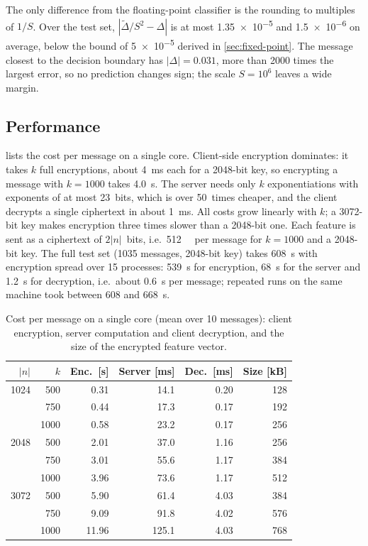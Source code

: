 The only difference from the floating-point classifier is the rounding to multiples of $1/S$.
Over the test set, $|\tilde{\Delta}/S^2 - \Delta|$ is at most \num{1.35e-5} and \num{1.5e-6} on average, below the bound of \num{5e-5} derived in \cref{sec:fixed-point}.
The message closest to the decision boundary has $|\Delta| = 0.031$, more than \num{2000} times the largest error, so no prediction changes sign; the scale $S = 10^6$ leaves a wide margin.

\subsection{Performance}

 lists the cost per message on a single core.
Client-side encryption dominates: it takes $k$ full encryptions, about \SI{4}{\milli\second} each for a \num{2048}-bit key, so encrypting a message with $k = 1000$ takes \SI{4.0}{\second}.
The server needs only $k$ exponentiations with exponents of at most 23~bits, which is over 50~times cheaper, and the client decrypts a single ciphertext in about \SI{1}{\milli\second}.
All costs grow linearly with $k$; a \num{3072}-bit key makes encryption three times slower than a \num{2048}-bit one.
Each feature is sent as a ciphertext of $2|n|$~bits, i.e.\ \SI{512}{\kilo\byte} per message for $k = 1000$ and a \num{2048}-bit key.
The full test set (\num{1035} messages, \num{2048}-bit key) takes \SI{608}{\second} with encryption spread over 15 processes: \SI{539}{\second} for encryption, \SI{68}{\second} for the server and \SI{1.2}{\second} for decryption, i.e.\ about \SI{0.6}{\second} per message; repeated runs on the same machine took between \num{608} and \SI{668}{\second}.

\begin{table}[htbp]
  \centering
  \caption{Cost per message on a single core (mean over 10 messages): client encryption, server computation and client decryption, and the size of the encrypted feature vector.}
  \label{tab:cost}
  \begin{tabular}{@{}rrrrrr@{}}
    \toprule
    $|n|$ & $k$ & Enc.\ [s] & Server [ms] & Dec.\ [ms] & Size [kB] \\
    \midrule
    1024 & 500  & 0.31  & 14.1  & 0.20 & 128 \\
         & 750  & 0.44  & 17.3  & 0.17 & 192 \\
         & 1000 & 0.58  & 23.2  & 0.17 & 256 \\
    \midrule
    2048 & 500  & 2.01  & 37.0  & 1.16 & 256 \\
         & 750  & 3.01  & 55.6  & 1.17 & 384 \\
         & 1000 & 3.96  & 73.6  & 1.17 & 512 \\
    \midrule
    3072 & 500  & 5.90  & 61.4  & 4.03 & 384 \\
         & 750  & 9.09  & 91.8  & 4.02 & 576 \\
         & 1000 & 11.96 & 125.1 & 4.03 & 768 \\
    \bottomrule
  \end{tabular}
\end{table}


